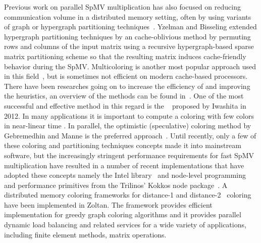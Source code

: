 Previous work on parallel SpMV multiplication has also focused on reducing communication volume in a distributed memory setting, often by using variants of graph or hypergraph partitioning techniques~\cite{Catalyurek:1999}. Yzelman and Bisseling \cite{doi:10.1137/080733243,Yzelman-thesis-2011} extended hypergraph partitioning techniques by an cache-oblivious method by permuting rows and columns of the input matrix using a recursive hypergraph-based sparse matrix partitioning scheme so that the resulting matrix induces cache-friendly behavior during the SpMV. Multicoloring is another most popular approach used in this field~\cite{MC}, but is sometimes not efficient on modern cache-based processors. There have been researches going on to increase the efficiency of \MCfull and improving the heuristics, an overview of the methods can be found in~\cite{dist_k_def,COLPACK,equitable_color}. One of the most successful and effective method in this regard is the \ABMCfull~\cite{ABMC} proposed by Iwashita \etal in 2012. In many applications it is important to compute a coloring with few colors in near-linear time \cite{doi:10.1137/13093426X}. In parallel, the optimistic (speculative) coloring method by Gebremedhin and Manne \cite{gebremedhin2000scalable} is the preferred approach~\cite{Boman:2016}. 
Until recently, only a few of these coloring and partitioning techniques concepts made it into mainstream software, but the increasingly stringent performance requirements for fast SpMV multiplication have resulted in a number of recent implementations that have adopted these concepts namely the Intel \MKL library~\cite{MKL} and node-level programming and performance primitives from the Trilinos’ Kokkos node package~\cite{kokkos}. A distributed memory coloring frameworks for distance-1\cite{BOZDAG2008515} and distance-2~\cite{doi:10.1137/080732158} coloring have been implemented in Zoltan. The framework provides efficient implementation for greedy graph coloring algorithms and it provides parallel dynamic load balancing and related services for a wide variety of applications, including finite element methods, matrix operations.


